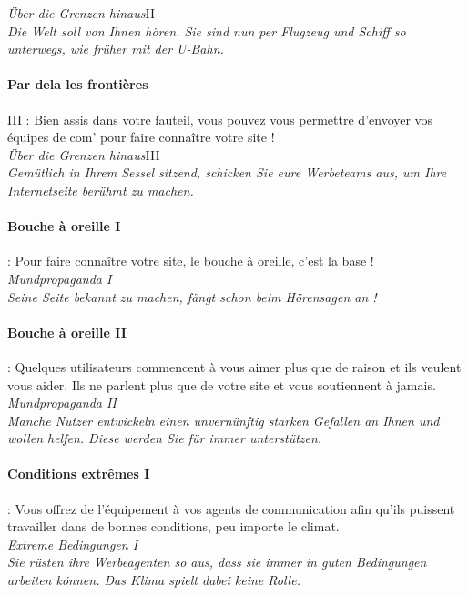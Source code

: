 \documentclass[10pt,a4paper]{article}
\begin{document}
\textit{Über die Grenzen hinaus}II\\
\textit{Die Welt soll von Ihnen hören. Sie sind nun per Flugzeug und Schiff so unterwegs, wie früher mit der U-Bahn.}


\paragraph{Par dela les frontières} III : Bien assis dans votre fauteil, vous pouvez vous permettre d'envoyer vos équipes de com' pour faire connaître votre site !\\

\textit{Über die Grenzen hinaus}III\\
\textit{Gemütlich in Ihrem Sessel sitzend, schicken Sie eure Werbeteams aus, um Ihre Internetseite berühmt zu machen.}


\paragraph{Bouche à oreille I} : Pour faire connaître votre site, le bouche à oreille, c'est la base !\\

\textit{Mundpropaganda I}\\
\textit{Seine Seite bekannt zu machen, fängt schon beim Hörensagen an !}


\paragraph{Bouche à oreille II} : Quelques utilisateurs commencent à vous aimer plus que de raison et ils veulent vous aider. Ils ne parlent plus que de votre site et vous soutiennent à jamais.\\

\textit{Mundpropaganda II}\\
\textit{Manche Nutzer entwickeln einen unvernünftig starken Gefallen an Ihnen und wollen helfen. Diese werden Sie für immer unterstützen.}


\paragraph{Conditions extrêmes I} : Vous offrez de l'équipement à vos agents de communication afin qu'ils puissent travailler dans de bonnes conditions, peu importe le climat.\\

\textit{Extreme Bedingungen I}\\
\textit{Sie rüsten ihre Werbeagenten so aus, dass sie immer in guten Bedingungen arbeiten können. Das Klima spielt dabei keine Rolle.}
\end{document}
